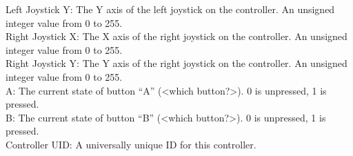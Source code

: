 \documentclass[11pt]{article}
\begin{document}
Left Joystick Y: The Y axis of the left joystick on the controller.  An unsigned integer value from 0 to 255.\\
Right Joystick X: The X axis of the right joystick on the controller.  An unsigned integer value from 0 to 255.\\
Right Joystick Y: The Y axis of the right joystick on the controller.  An unsigned integer value from 0 to 255.\\
A: The current state of button “A” (<which button?>).  0 is unpressed, 1 is pressed.\\
B: The current state of button “B” (<which button?>).  0 is unpressed, 1 is pressed.\\
Controller UID: A universally unique ID for this controller.


\end{document}
